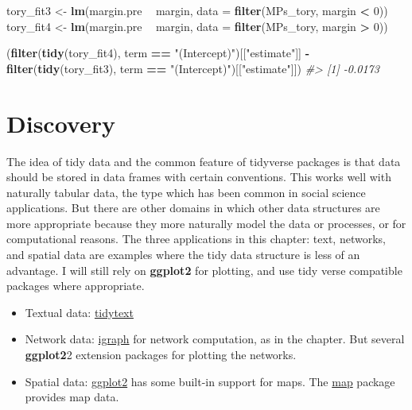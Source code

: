 \documentclass[]{book}
\newenvironment{Shaded}{\begin{snugshade}}{\end{snugshade}}
\newcommand{\KeywordTok}[1]{\textcolor[rgb]{0.13,0.29,0.53}{\textbf{#1}}}
\newcommand{\DataTypeTok}[1]{\textcolor[rgb]{0.13,0.29,0.53}{#1}}
\newcommand{\DecValTok}[1]{\textcolor[rgb]{0.00,0.00,0.81}{#1}}
\newcommand{\StringTok}[1]{\textcolor[rgb]{0.31,0.60,0.02}{#1}}
\newcommand{\CommentTok}[1]{\textcolor[rgb]{0.56,0.35,0.01}{\textit{#1}}}
\newcommand{\OperatorTok}[1]{\textcolor[rgb]{0.81,0.36,0.00}{\textbf{#1}}}
\newcommand{\NormalTok}[1]{#1}
\theoremstyle{definition}
\theoremstyle{definition}
\theoremstyle{definition}
\theoremstyle{remark}
\begin{document}
\begin{Shaded}
\begin{Highlighting}[]
\NormalTok{tory_fit3 <-}\StringTok{ }\KeywordTok{lm}\NormalTok{(margin.pre }\OperatorTok{~}\StringTok{ }\NormalTok{margin, }\DataTypeTok{data =} \KeywordTok{filter}\NormalTok{(MPs_tory, margin }\OperatorTok{<}\StringTok{ }\DecValTok{0}\NormalTok{))}
\NormalTok{tory_fit4 <-}\StringTok{ }\KeywordTok{lm}\NormalTok{(margin.pre }\OperatorTok{~}\StringTok{ }\NormalTok{margin, }\DataTypeTok{data =} \KeywordTok{filter}\NormalTok{(MPs_tory, margin }\OperatorTok{>}\StringTok{ }\DecValTok{0}\NormalTok{))}

\NormalTok{(}\KeywordTok{filter}\NormalTok{(}\KeywordTok{tidy}\NormalTok{(tory_fit4), term }\OperatorTok{==}\StringTok{ "(Intercept)"}\NormalTok{)[[}\StringTok{"estimate"}\NormalTok{]] }\OperatorTok{-}
\StringTok{ }\KeywordTok{filter}\NormalTok{(}\KeywordTok{tidy}\NormalTok{(tory_fit3), term }\OperatorTok{==}\StringTok{ "(Intercept)"}\NormalTok{)[[}\StringTok{"estimate"}\NormalTok{]])}
\CommentTok{#> [1] -0.0173}
\end{Highlighting}
\end{Shaded}

\chapter{Discovery}\label{discovery}

The idea of tidy data and the common feature of tidyverse packages is
that data should be stored in data frames with certain conventions. This
works well with naturally tabular data, the type which has been common
in social science applications. But there are other domains in which
other data structures are more appropriate because they more naturally
model the data or processes, or for computational reasons. The three
applications in this chapter: text, networks, and spatial data are
examples where the tidy data structure is less of an advantage. I will
still rely on \textbf{ggplot2} for plotting, and use tidy verse
compatible packages where appropriate.

\begin{itemize}
\item
  Textual data:
  \href{https://cran.r-project.org/package=tidytext}{tidytext}
\item
  Network data: \href{https://cran.r-project.org/package=igraph}{igraph}
  for network computation, as in the chapter. But several
  \textbf{ggplot2}2 extension packages for plotting the networks.
\item
  Spatial data:
  \href{https://cran.r-project.org/package=ggplot2}{ggplot2} has some
  built-in support for maps. The
  \href{https://cran.r-project.org/package=map}{map} package provides
  map data.
\end{itemize}
\end{document}
